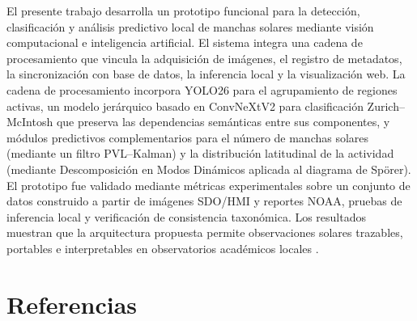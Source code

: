 \documentclass[final,times,twocolumn,5p]{ResumenEjecutivoLocal}
\begin{document}
\begin{frontmatter}
\begin{resumen}
El presente trabajo desarrolla un prototipo funcional para la detección, clasificación y análisis predictivo local de manchas solares mediante visión computacional e inteligencia artificial. El sistema integra una cadena de procesamiento que vincula la adquisición de imágenes, el registro de metadatos, la sincronización con base de datos, la inferencia local y la visualización web. La cadena de procesamiento incorpora YOLO26 para el agrupamiento de regiones activas, un modelo jerárquico basado en ConvNeXtV2 para clasificación Zurich--McIntosh que preserva las dependencias semánticas entre sus componentes, y módulos predictivos complementarios para el número de manchas solares (mediante un filtro PVL--Kalman) y la distribución latitudinal de la actividad (mediante Descomposición en Modos Dinámicos aplicada al diagrama de Spörer). El prototipo fue validado mediante métricas experimentales sobre un conjunto de datos construido a partir de imágenes SDO/HMI y reportes NOAA, pruebas de inferencia local y verificación de consistencia taxonómica. Los resultados muestran que la arquitectura propuesta permite observaciones solares trazables, portables e interpretables en observatorios académicos locales \citep{ultralyticsYOLO26,woo2023convnextv2,raspberryPi5Docs2026}.
\end{resumen}

\end{frontmatter}
\pagestyle{fancy}











\section{Referencias}




\end{document}
